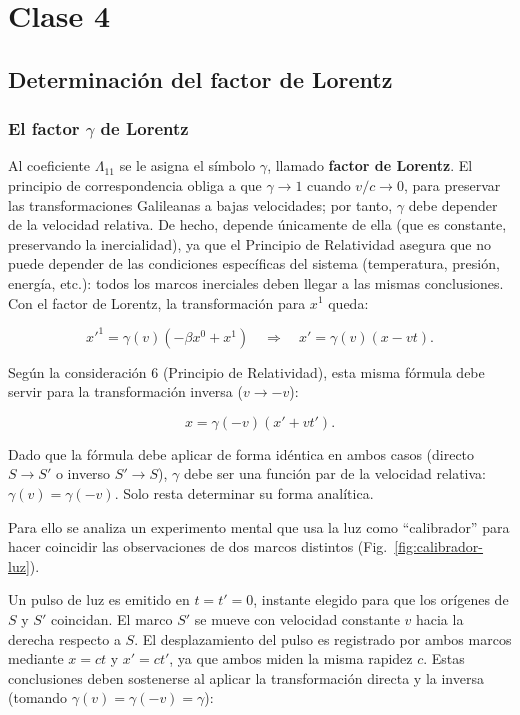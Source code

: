 \chapter{Clase 4}

\section{Determinación del factor de Lorentz}

\subsection{El factor \texorpdfstring{$\gamma$}{gamma} de Lorentz}

Al coeficiente $\Lambda_{11}$ se le asigna el símbolo $\gamma$, llamado \textbf{factor de Lorentz}. El principio de correspondencia obliga a que $\gamma \to 1$ cuando $v/c \to 0$, para preservar las transformaciones Galileanas a bajas velocidades; por tanto, $\gamma$ debe depender de la velocidad relativa. De hecho, depende únicamente de ella (que es constante, preservando la inercialidad), ya que el Principio de Relatividad asegura que no puede depender de las condiciones específicas del sistema (temperatura, presión, energía, etc.): todos los marcos inerciales deben llegar a las mismas conclusiones. Con el factor de Lorentz, la transformación para $x^1$ queda:

$$x'^1 = \gamma(v)(-\beta x^0 + x^1) \quad \Longrightarrow \quad x' = \gamma(v)(x - vt).$$

Según la consideración 6 (Principio de Relatividad), esta misma fórmula debe servir para la transformación inversa ($v \to -v$):

$$x = \gamma(-v)(x' + vt').$$

Dado que la fórmula debe aplicar de forma idéntica en ambos casos (directo $S \to S'$ o inverso $S' \to S$), $\gamma$ debe ser una función par de la velocidad relativa: $\gamma(v) = \gamma(-v)$. Solo resta determinar su forma analítica.

Para ello se analiza un experimento mental que usa la luz como ``calibrador'' para hacer coincidir las observaciones de dos marcos distintos (Fig.~\ref{fig:calibrador-luz}).



Un pulso de luz es emitido en $t=t'=0$, instante elegido para que los orígenes de $S$ y $S'$ coincidan. El marco $S'$ se mueve con velocidad constante $v$ hacia la derecha respecto a $S$. El desplazamiento del pulso es registrado por ambos marcos mediante $x=ct$ y $x'=ct'$, ya que ambos miden la misma rapidez $c$. Estas conclusiones deben sostenerse al aplicar la transformación directa y la inversa (tomando $\gamma(v)=\gamma(-v)=\gamma$):

